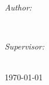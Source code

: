 \documentclass[12pt, letterpaper]{article}
\begin{document}
\vfill %

\begin{minipage}{0.4\textwidth}
	\begin{flushleft} \large
	\emph{Author:}\\
	\paperauthor
	\end{flushleft}
	\end{minipage}
	~
	\begin{minipage}{0.4\textwidth}
	\begin{flushright} \large
	\emph{Supervisor:} \\
	\papersupervisor
	\end{flushright}
\end{minipage}\\[1cm]

{\large \today}\\ %

\newpage
\end{document}
